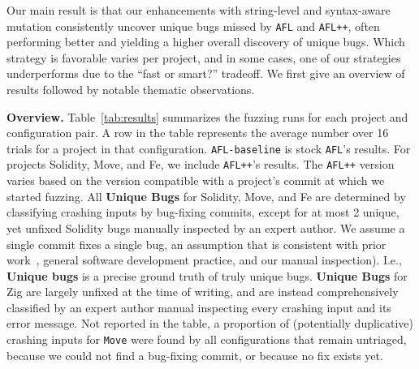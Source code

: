 Our main result is that our enhancements with string-level and syntax-aware
mutation consistently uncover unique bugs missed by \texttt{AFL} and
\texttt{AFL++}, often performing better and yielding a higher overall discovery
of unique bugs. Which strategy is favorable varies per project, and in some
cases, one of our strategies underperforms due to the ``fast or smart?''
tradeoff. We first give an overview of results followed by notable
thematic observations.

\noindent \textbf{Overview.} Table~\ref{tab:results} summarizes the fuzzing
runs for each project and configuration pair. A row in the table represents the
average number over 16 trials for a project in that configuration.
\texttt{AFL-baseline} is stock \texttt{AFL}'s results. For projects Solidity,
Move, and Fe, we include \texttt{AFL++}'s results. The \texttt{AFL++} version
varies based on the version compatible with a project's commit at which we
started fuzzing. All \textbf{Unique Bugs} for Solidity, Move, and Fe are
determined by classifying crashing inputs by bug-fixing commits, except for at
most 2 unique, yet unfixed Solidity bugs manually inspected by an expert
author. We assume a single commit fixes a single bug, an assumption that is
consistent with prior work~\cite{semantic-crash-bucketing,Taming}, general
software development practice, and our manual inspection). I.e., \textbf{Unique
bugs} is a precise ground truth of truly unique bugs. \textbf{Unique Bugs} for
Zig are largely unfixed at the time of writing, and are instead comprehensively
classified by an expert author manual inspecting every crashing input and its
error message. Not reported in the table, a proportion of (potentially
duplicative) crashing inputs for \texttt{Move} were found by all configurations
that remain untriaged, because we could not find a bug-fixing commit, or
because no fix exists yet.

